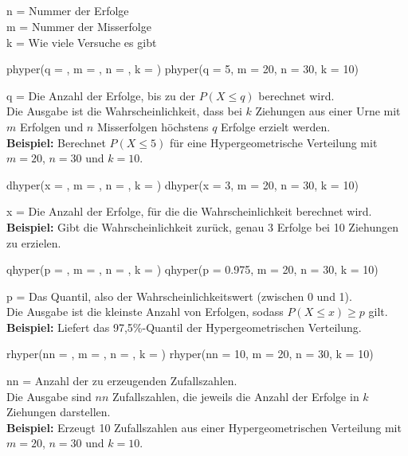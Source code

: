 \subsection{}
n = Nummer der Erfolge\\
m = Nummer der Misserfolge\\
k = Wie viele Versuche es gibt\\
\begin{rcode}{1}
phyper(q = , m = , n = , k = )
phyper(q = 5, m = 20, n = 30, k = 10)
\end{rcode}
q = Die Anzahl der Erfolge, bis zu der \(P(X \le q)\) berechnet wird.\\
Die Ausgabe ist die Wahrscheinlichkeit, dass bei \(k\) Ziehungen aus einer Urne mit \(m\) Erfolgen und \(n\) Misserfolgen höchstens \(q\) Erfolge erzielt werden.\\
\textbf{Beispiel:} Berechnet \(P(X \le 5)\) für eine Hypergeometrische Verteilung mit \(m = 20\), \(n = 30\) und \(k = 10\).\\

\begin{rcode}{1}
dhyper(x = , m = , n = , k = )
dhyper(x = 3, m = 20, n = 30, k = 10)
\end{rcode}
x = Die Anzahl der Erfolge, für die die Wahrscheinlichkeit berechnet wird.\\
\textbf{Beispiel:} Gibt die Wahrscheinlichkeit zurück, genau 3 Erfolge bei 10 Ziehungen zu erzielen.\\

\bigskip

\begin{rcode}{1}
qhyper(p = , m = , n = , k = )
qhyper(p = 0.975, m = 20, n = 30, k = 10)
\end{rcode}
p = Das Quantil, also der Wahrscheinlichkeitswert (zwischen 0 und 1).\\
Die Ausgabe ist die kleinste Anzahl von Erfolgen, sodass \(P(X \le x) \ge p\) gilt.\\
\textbf{Beispiel:} Liefert das 97,5\%-Quantil der Hypergeometrischen Verteilung.\\

\begin{rcode}{1}
rhyper(nn = , m = , n = , k = )
rhyper(nn = 10, m = 20, n = 30, k = 10)
\end{rcode}
nn = Anzahl der zu erzeugenden Zufallszahlen.\\
Die Ausgabe sind \(nn\) Zufallszahlen, die jeweils die Anzahl der Erfolge in \(k\) Ziehungen darstellen.\\
\textbf{Beispiel:} Erzeugt 10 Zufallszahlen aus einer Hypergeometrischen Verteilung mit \(m = 20\), \(n = 30\) und \(k = 10\).


